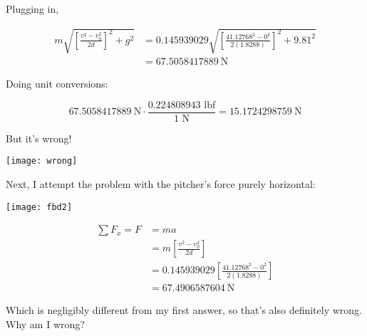 \documentclass[11pt]{article}
\begin{document}
Plugging in,

\begin{align*}
      m \sqrt{\left[\frac{v^2 - v_0^2}{2d}\right]^2 + g^2} & =  0.145939029 \sqrt{\left[\frac{41.12768^2 - 0^2}{2(1.8288)}\right]^2 + 9.81^2} \\
                                                           & =  \SI{67.5058417889}{\newton}
\end{align*}

Doing unit conversions:

\[\SI{67.5058417889}{\newton} \cdot \frac{0.224808943 \text{ lbf}}{1 \text{ N}} = \SI{15.1724298759}{\newton}\]

But it's wrong!

\texttt{[image: wrong]}

Next, I attempt the problem with the pitcher's force purely horizontal:

\texttt{[image: fbd2]}


\begin{align*}
      \sum F_{x} = F & = ma                                                         \\
                     & = m\left[\frac{v^2 - v_0^2}{2d}\right]                       \\
                     & = 0.145939029\left[\frac{41.12768^2 - 0^2}{2(1.8288)}\right] \\
                     & = \SI{67.4906587604}{\newton}
\end{align*}

Which is negligibly different from my first answer, so that's also definitely wrong. \\

Why am I wrong?
\end{document}
